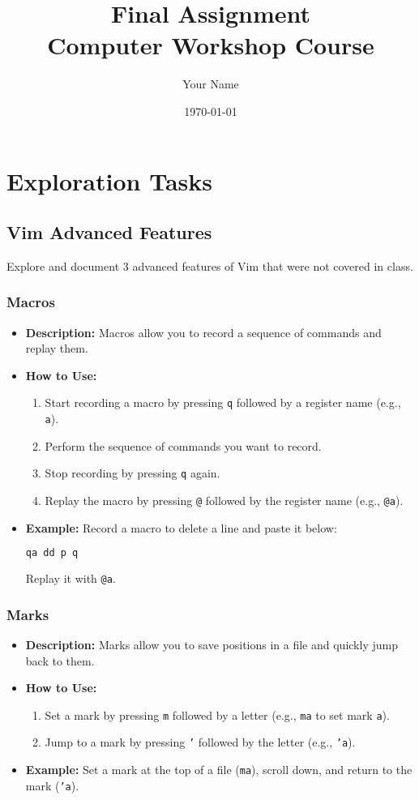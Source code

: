 \documentclass{article}
\title{Final Assignment \\ Computer Workshop Course}
\author{Your Name}
\date{\today}
\begin{document}
\maketitle
\tableofcontents
\newpage

\section{Exploration Tasks}

\subsection{Vim Advanced Features}
Explore and document 3 advanced features of Vim that were not covered in class.

\subsubsection{Macros}
\begin{itemize}
    \item \textbf{Description:} Macros allow you to record a sequence of commands and replay them.
    \item \textbf{How to Use:}
    \begin{enumerate}
        \item Start recording a macro by pressing \texttt{q} followed by a register name (e.g., \texttt{a}).
        \item Perform the sequence of commands you want to record.
        \item Stop recording by pressing \texttt{q} again.
        \item Replay the macro by pressing \texttt{@} followed by the register name (e.g., \texttt{@a}).
    \end{enumerate}
    \item \textbf{Example:} Record a macro to delete a line and paste it below:
    \begin{lstlisting}[language=bash]
    qa dd p q
    \end{lstlisting}
    Replay it with \texttt{@a}.
\end{itemize}

\subsubsection{Marks}
\begin{itemize}
    \item \textbf{Description:} Marks allow you to save positions in a file and quickly jump back to them.
    \item \textbf{How to Use:}
    \begin{enumerate}
        \item Set a mark by pressing \texttt{m} followed by a letter (e.g., \texttt{ma} to set mark \texttt{a}).
        \item Jump to a mark by pressing \texttt{'} followed by the letter (e.g., \texttt{'a}).
    \end{enumerate}
    \item \textbf{Example:} Set a mark at the top of a file (\texttt{ma}), scroll down, and return to the mark (\texttt{'a}).
\end{itemize}
\end{document}

